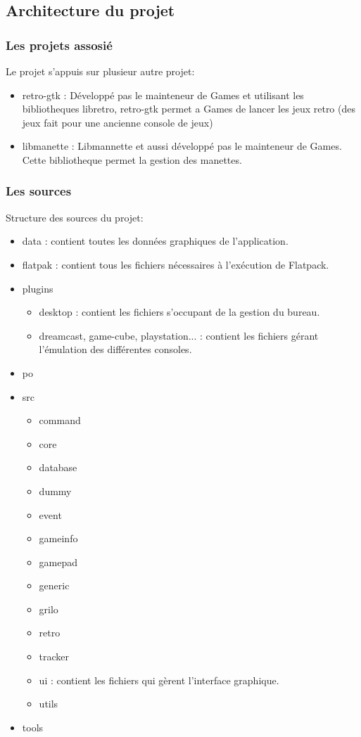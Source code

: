 \documentclass[12pt]{report}
\begin{document}
\subsection{Architecture du projet}
\subsubsection{Les projets assosié}
Le projet s'appuis sur plusieur autre projet:
\begin{itemize}
\item retro-gtk : Développé pas le mainteneur de Games et utilisant les bibliotheques libretro,
retro-gtk permet a Games de lancer les jeux retro (des jeux fait pour une ancienne console de jeux)
\item libmanette : Libmannette et aussi développé pas le mainteneur de Games. Cette bibliotheque permet
la gestion des manettes.
\end{itemize}

\subsubsection{Les sources}
Structure des sources du projet:
\begin{itemize}
\item data : contient toutes les données graphiques de l'application.
\item flatpak : contient tous les fichiers nécessaires à l'exécution de Flatpack.
\item plugins
\begin{itemize}
\item desktop : contient les fichiers s'occupant de la gestion du bureau.
\item dreamcast, game-cube, playstation... :  contient les fichiers gérant l'émulation des différentes consoles.
\end{itemize}
\item po
\item src
\begin{itemize}
\item command
\item core
\item database
\item dummy
\item event
\item gameinfo
\item gamepad
\item generic
\item grilo
\item retro
\item tracker
\item ui : contient les fichiers qui gèrent l'interface graphique.
\item utils
\end{itemize}
\item tools
\end{itemize}
\end{document}
